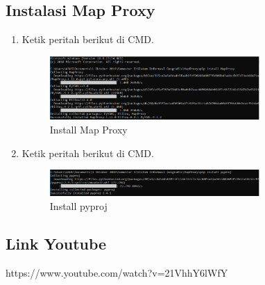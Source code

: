 \subsection{Instalasi Map Proxy}
\begin{enumerate}
	\item  Ketik peritah berikut di CMD.
	\hfill\break
	\begin{figure}[H]
		\includegraphics[width=8cm]{figures/Tugas4/1174089/9.png}
		\centering
		\caption{Install Map Proxy}
	\end{figure}
	\item  Ketik peritah berikut di CMD.
	\hfill\break
	\begin{figure}[H]
		\includegraphics[width=8cm]{figures/Tugas4/1174089/10.png}
		\centering
		\caption{Install pyproj}
	\end{figure}
\end{enumerate}
\subsection{Link Youtube}
https://www.youtube.com/watch?v=21VhhY6lWfY
